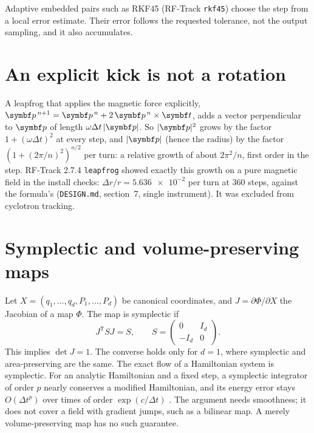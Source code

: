 Adaptive embedded pairs such as RKF45 (RF-Track \texttt{rkf45}) choose the step from a local error estimate.
Their error follows the requested tolerance, not the output sampling, and it also accumulates.

\section{An explicit kick is not a rotation}
A leapfrog that applies the magnetic force explicitly, $\vect p^{\,n+1} = \vect p^{\,n} + 2\,\vect p^{\,n}\times\vect t$,
adds a vector perpendicular to $\vect p$ of length $\omega\Delta t\,|\vect p|$.
So $|\vect p|^2$ grows by the factor $1+(\omega\Delta t)^2$ at every step, and $|\vect p|$ (hence the radius) by the
factor $(1+(2\pi/n)^2)^{n/2}$ per turn: a relative growth of about $2\pi^2/n$, first order in the step.
RF-Track 2.7.4 \texttt{leapfrog} showed exactly this growth on a pure magnetic field in the install checks:
$\Delta r/r = \num{5.636e-2}$ per turn at 360 steps, against the formula's \LeapfrogPred{} (\texttt{DESIGN.md},
section~7, single instrument).
It was excluded from cyclotron tracking.

\section{Symplectic and volume-preserving maps}
Let $X = (q_1,\dots,q_d,P_1,\dots,P_d)$ be canonical coordinates, and $J = \partial\Phi/\partial X$ the Jacobian of a
map $\Phi$.
The map is symplectic if
\begin{equation}
J^\mathsf{T} S J = S,\qquad S = \begin{pmatrix}0 & I_d\\ -I_d & 0\end{pmatrix}.
\label{eq:symplectic}
\end{equation}
This implies $\det J = 1$.
The converse holds only for $d = 1$, where symplectic and area-preserving are the same.
The exact flow of a Hamiltonian system is symplectic.
For an analytic Hamiltonian and a fixed step, a symplectic integrator of order $p$ nearly conserves a modified
Hamiltonian, and its energy error stays $O(\Delta t^p)$ over times of order $\exp(c/\Delta t)$ \cite{hairer2006}.
The argument needs smoothness; it does not cover a field with gradient jumps, such as a bilinear map.
A merely volume-preserving map has no such guarantee.

